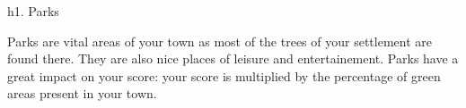 h1. Parks

Parks are vital areas of your town as most of the trees of your settlement are found there.   They are also nice places of leisure and entertainement. Parks have a great impact on your score: your score is multiplied by the percentage of green areas present in your town.